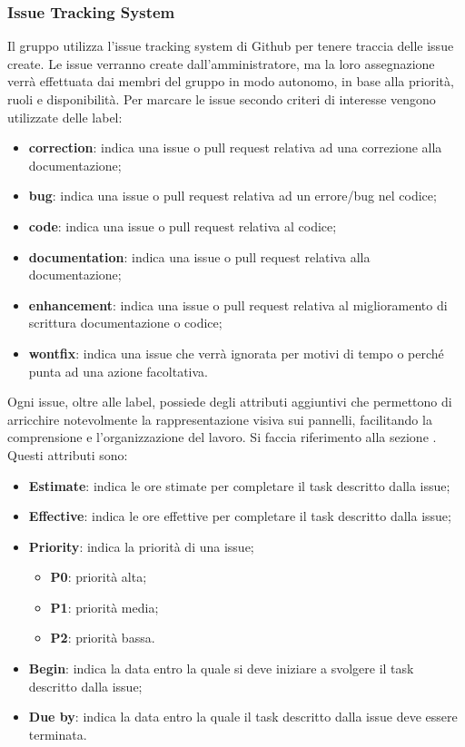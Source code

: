 \subsubsection{Issue Tracking System}\label{inf:its}
Il gruppo utilizza l'issue tracking system di Github per tenere traccia delle
issue create. Le issue verranno create dall'amministratore, ma la loro
assegnazione verrà effettuata dai membri del gruppo in modo autonomo, in base
alla priorità, ruoli e disponibilità. Per marcare le issue secondo criteri di
interesse vengono utilizzate delle label:
\begin{itemize}
    \item \textbf{correction}: indica una issue o pull request relativa ad una correzione alla documentazione;
    \item \textbf{bug}: indica una issue o pull request relativa ad un errore/bug nel codice;
    \item \textbf{code}: indica una issue o pull request relativa al codice;
    \item \textbf{documentation}: indica una issue o pull request relativa alla documentazione;
    \item \textbf{enhancement}: indica una issue o pull request relativa al miglioramento di scrittura documentazione o codice;
    \item \textbf{wontfix}: indica una issue che verrà ignorata per motivi di tempo o perché punta ad una azione facoltativa.
\end{itemize}
Ogni issue, oltre alle label, possiede degli attributi aggiuntivi che permettono di arricchire
notevolmente la rappresentazione visiva sui pannelli, facilitando la comprensione e l'organizzazione del lavoro.
Si faccia riferimento alla sezione .
Questi attributi sono:
\begin{itemize}
    \item \textbf{Estimate}: indica le ore stimate per completare il task descritto dalla issue;
    \item \textbf{Effective}: indica le ore effettive per completare il task descritto dalla issue;
    \item \textbf{Priority}: indica la priorità di una issue;
          \begin{itemize}
              \item \textbf{P0}: priorità alta;
              \item \textbf{P1}: priorità media;
              \item \textbf{P2}: priorità bassa.
          \end{itemize}
    \item \textbf{Begin}: indica la data entro la quale si deve iniziare a svolgere il task descritto dalla issue;
    \item \textbf{Due by}: indica la data entro la quale il task descritto dalla issue deve essere terminata.
\end{itemize}

